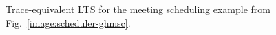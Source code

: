 \begin{figure}
\centering
{}
\caption{Trace-equivalent LTS for the meeting scheduling example from Fig.~\ref{image:scheduler-ghmsc}.\label{image:scheduler-lts}}
\end{figure}

